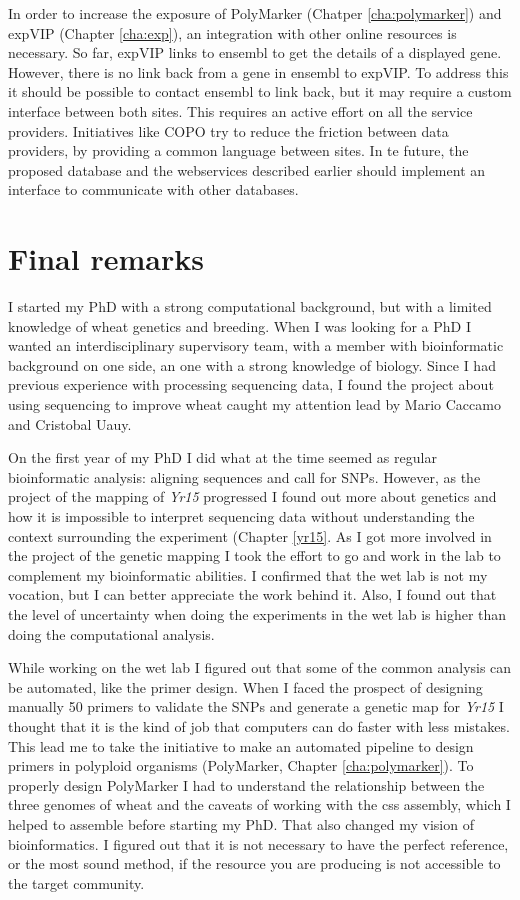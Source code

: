 In order to increase the exposure of PolyMarker (Chatper \ref{cha:polymarker}) and expVIP (Chapter \ref{cha:exp}), an integration with other online resources is necessary. 
So far, expVIP links to ensembl to get the details of a displayed gene. 
However, there is no link back from a gene in ensembl to expVIP. 
To address this it should be possible to contact ensembl to link back, but it may require a custom interface between both sites. 
This requires an active effort on all the service providers. 
Initiatives like COPO try to reduce the friction between data providers, by providing a common language between sites. 
In te future, the proposed database and the webservices described earlier should implement an interface to communicate with other databases. 

\section{Final remarks}

I started my PhD with a strong computational background, but with a limited knowledge of wheat genetics and breeding.
When I was looking for a PhD I wanted an interdisciplinary supervisory team, with a member with bioinformatic background on one side, an one with a strong knowledge of biology. 
Since I had previous experience with processing sequencing data, I found the project about using sequencing to improve wheat caught my attention lead by Mario Caccamo and Cristobal Uauy. 

On the first year of my PhD I did what at the time seemed as regular bioinformatic analysis: aligning sequences and call for SNPs. 
However, as the project of the mapping of \textit{Yr15} progressed I found out more about genetics and how it is impossible to interpret sequencing data without understanding the context surrounding the experiment (Chapter \ref{yr15}. 
As I got more involved in the project of the genetic mapping I took the effort to go and work in the lab to complement my bioinformatic abilities. 
I confirmed that the wet lab is not my vocation, but I can better appreciate the work behind it. 
Also, I found out that the level of uncertainty when doing the experiments in the wet lab is higher than doing the computational analysis. 

While working on the wet lab I figured out that some of the common analysis can be automated, like the primer design. 
When I faced the prospect of designing manually 50 primers to validate the SNPs and generate a genetic map for \textit{Yr15} I thought that it is the kind of job that computers can do faster with less mistakes. 
This lead me to take the initiative to make an automated pipeline to design primers in polyploid organisms (PolyMarker, Chapter \ref{cha:polymarker}).
To properly design PolyMarker I had to understand the relationship between the three genomes of wheat and the caveats of working with the \acrshort{css} assembly, which I helped to assemble before starting my PhD. 
That also changed my vision of bioinformatics. 
I figured out that it is not necessary to have the perfect reference, or the most sound method, if the resource you are producing is not accessible to the target community. 

